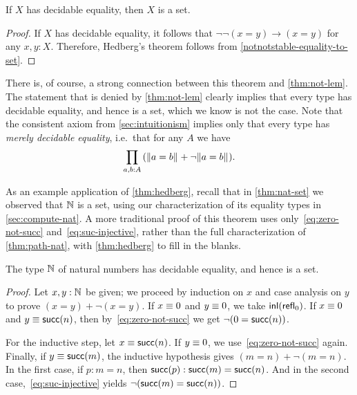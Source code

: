 \begin{thm}[Hedberg]\label{thm:hedberg}
  If $X$ has decidable equality, then $X$ is a set.
\end{thm}

\begin{proof}
If $X$ has decidable equality, it follows that $\neg\neg(x=y)\to(x=y)$ for any
$x,y:X$. Therefore, Hedberg's theorem follows from 
\autoref{notnotstable-equality-to-set}.
\end{proof}

There is, of course, a strong connection between this theorem and \autoref{thm:not-lem}.
The statement \LEM{\infty} that is denied by \autoref{thm:not-lem} clearly implies that every type has decidable equality, and hence is a set, which we know is not the case.
%
Note that the consistent axiom \LEM{} from \autoref{sec:intuitionism} implies only that every type has \emph{merely decidable equality}, i.e.\ that for any $A$ we have
%
%
\[ \prd{a,b:A} (\brck{a=b} + \neg\brck{a=b}). \]

%

As an example application of \autoref{thm:hedberg}, recall that in \autoref{thm:nat-set} we observed that $\mathbb{N}$ is a set, using our characterization of its equality types in
\autoref{sec:compute-nat}.
A more traditional proof of this theorem uses only~\eqref{eq:zero-not-succ} and~\eqref{eq:suc-injective}, rather than the full
characterization of \autoref{thm:path-nat}, with \autoref{thm:hedberg} to fill in the blanks.

\begin{thm}\label{prop:nat-is-set}
 The type $\mathbb{N}$ of natural numbers has decidable equality, and hence is a set.
\end{thm}

\begin{proof}
  Let $x, y : \mathbb{N}$ be given; we proceed by induction on $x$ and case analysis on $y$ to prove $(x=y)+\neg(x=y)$.
  If $x \equiv 0$ and $y \equiv 0$, we take ${\mathsf{inl}}(\mathsf{refl}_{0})$.
  If $x \equiv 0$ and $y \equiv \mathsf{succ}(n)$, then by~\eqref{eq:zero-not-succ} we get $\neg (0 = \mathsf{succ} (n))$.

  For the inductive step, let $x \equiv \mathsf{succ} (n)$.
  If $y \equiv 0$, we use~\eqref{eq:zero-not-succ} again.
  Finally, if $y \equiv \mathsf{succ} (m)$, the inductive hypothesis gives $(m = n)+\neg(m = n)$.
  In the first case, if $p:m=n$, then ${\mathsf{succ}}\mathopen{}\left({p}\right)\mathclose{}:\mathsf{succ}(m)=\mathsf{succ}(n)$.
  And in the second case,~\eqref{eq:suc-injective} yields $\neg(\mathsf{succ}(m)=\mathsf{succ}(n))$.
\end{proof}

